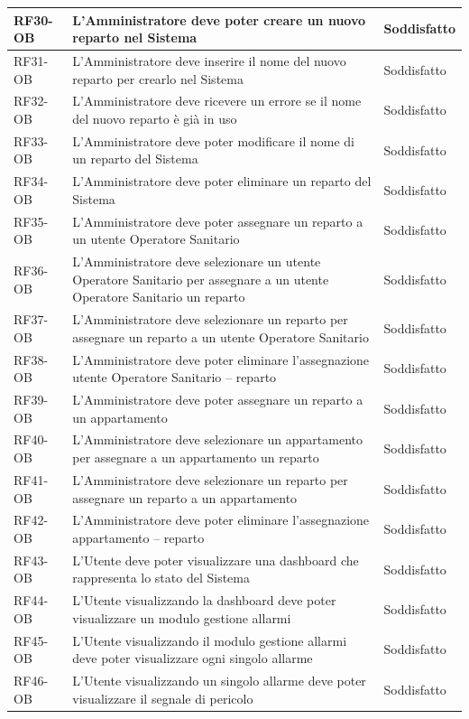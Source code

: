 \begin{longtable}{|p{2.5cm}|p{9cm}|p{3cm}|}
\hline
RF30-OB & L'Amministratore deve poter creare un nuovo reparto nel Sistema & Soddisfatto \\
\hline
RF31-OB & L'Amministratore deve inserire il nome del nuovo reparto per crearlo nel Sistema & Soddisfatto \\
\hline
RF32-OB & L'Amministratore deve ricevere un errore se il nome del nuovo reparto è già in uso & Soddisfatto \\
\hline
RF33-OB & L'Amministratore deve poter modificare il nome di un reparto del Sistema & Soddisfatto \\
\hline
RF34-OB & L'Amministratore deve poter eliminare un reparto del Sistema & Soddisfatto \\
\hline
RF35-OB & L'Amministratore deve poter assegnare un reparto a un utente Operatore Sanitario & Soddisfatto \\
\hline
RF36-OB & L'Amministratore deve selezionare un utente Operatore Sanitario per assegnare a un utente Operatore Sanitario un reparto & Soddisfatto \\
\hline
RF37-OB & L'Amministratore deve selezionare un reparto per assegnare un reparto a un utente Operatore Sanitario & Soddisfatto \\
\hline
RF38-OB & L'Amministratore deve poter eliminare l'assegnazione utente Operatore Sanitario -- reparto & Soddisfatto \\
\hline
RF39-OB & L'Amministratore deve poter assegnare un reparto a un appartamento & Soddisfatto \\
\hline
RF40-OB & L'Amministratore deve selezionare un appartamento per assegnare a un appartamento un reparto & Soddisfatto \\
\hline
RF41-OB & L'Amministratore deve selezionare un reparto per assegnare un reparto a un appartamento & Soddisfatto \\
\hline
RF42-OB & L'Amministratore deve poter eliminare l'assegnazione appartamento -- reparto & Soddisfatto \\
\hline
RF43-OB & L'Utente deve poter visualizzare una dashboard che rappresenta lo stato del Sistema & Soddisfatto \\
\hline
RF44-OB & L'Utente visualizzando la dashboard deve poter visualizzare un modulo gestione allarmi & Soddisfatto \\
\hline
RF45-OB & L'Utente visualizzando il modulo gestione allarmi deve poter visualizzare ogni singolo allarme & Soddisfatto \\
\hline
RF46-OB & L'Utente visualizzando un singolo allarme deve poter visualizzare il segnale di pericolo & Soddisfatto \\

\end{longtable}
